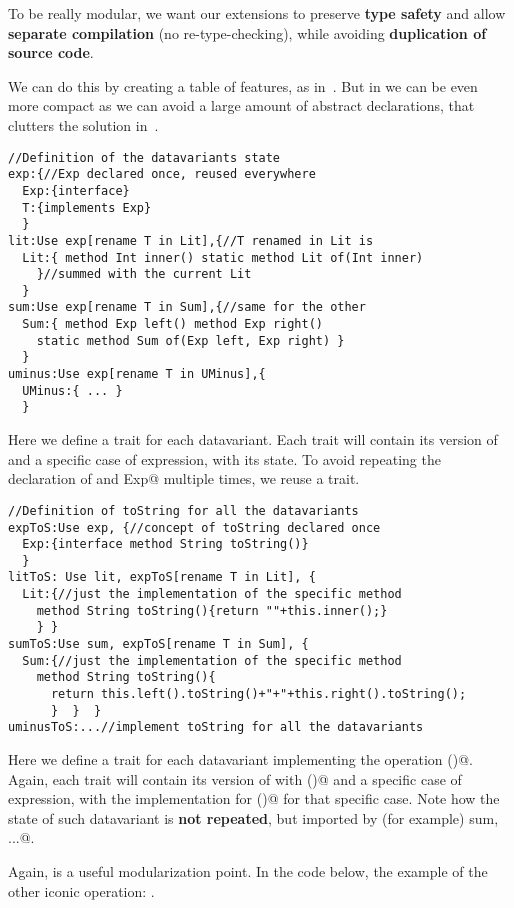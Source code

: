 To be really modular, we want our extensions to
preserve \textbf{type safety}
and allow \textbf{separate compilation} (no re-type-checking),
while avoiding \textbf{duplication of source code}.

We can do this by creating a table of features, as in~\cite{Deepfjig}.
But in \name we can be even more compact as we can avoid a large amount of abstract declarations,
that clutters the solution in~\cite{Deepfjig}.


\begin{lstlisting}
//Definition of the datavariants state
exp:{//Exp declared once, reused everywhere
  Exp:{interface}
  T:{implements Exp}
  }
lit:Use exp[rename T in Lit],{//T renamed in Lit is 
  Lit:{ method Int inner() static method Lit of(Int inner)
    }//summed with the current Lit
  }
sum:Use exp[rename T in Sum],{//same for the other
  Sum:{ method Exp left() method Exp right()
    static method Sum of(Exp left, Exp right) }
  }
uminus:Use exp[rename T in UMinus],{
  UMinus:{ ... }
  }

\end{lstlisting}
Here we define a trait for each datavariant.
Each trait will contain its version of \Q@Exp@
and a specific case of expression, with its state.
 To avoid repeating the declaration of \Q@Exp@ 
and \Q@implements Exp@ multiple times, we reuse
a \Q@exp@ trait.

\begin{lstlisting}
//Definition of toString for all the datavariants
expToS:Use exp, {//concept of toString declared once
  Exp:{interface method String toString()}
  }
litToS: Use lit, expToS[rename T in Lit], {
  Lit:{//just the implementation of the specific method
    method String toString(){return ""+this.inner();}
    } }
sumToS:Use sum, expToS[rename T in Sum], {
  Sum:{//just the implementation of the specific method
    method String toString(){
      return this.left().toString()+"+"+this.right().toString();
      }  }  }
uminusToS:...//implement toString for all the datavariants
\end{lstlisting}

Here we define a trait for each datavariant implementing the operation \Q@toString()@.
Again, each trait will contain its version of \Q@Exp@ with \Q@toString()@
and a specific case of expression, with the implementation for \Q@toString()@
for that specific case. Note how the state of such datavariant is 
\textbf{not repeated}, but imported by (for example) \Q@Use sum, ...@.

Again, \Q@expToS@ is a useful modularization point.
In the code below, the example of the other iconic operation: \Q@eval@.

